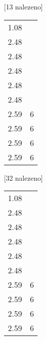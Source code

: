 \begin{table}[H]
\begin{tt}

\horizlina

\noindent
\begin{minipage}[t]{.5\textwidth}\vspace{0pt}
 [13 nalezeno]\vspace{5pt}

\begin{tabulary}{1.1\textwidth}{LL}
1.08 &   \\
2.48 &   \\
2.48 &   \\
2.48 &   \\
2.48 &   \\
2.48 &   \\
2.59 &  6 \\
2.59 &  6 \\
2.59 &  6 \\
2.59 &  6 \\
\end{tabulary}
\end{minipage}
\begin{minipage}[t]{.5\textwidth}\vspace{0pt}
 [32 nalezeno]\vspace{5pt}

\begin{tabulary}{1.1\textwidth}{LL}
1.08 &   \\
2.48 &   \\
2.48 &   \\
2.48 &   \\
2.48 &   \\
2.48 &   \\
2.59 &  6 \\
2.59 &  6 \\
2.59 &  6 \\
2.59 &  6 \\
\end{tabulary}


\end{minipage}
\end{tt}
\end{table}
